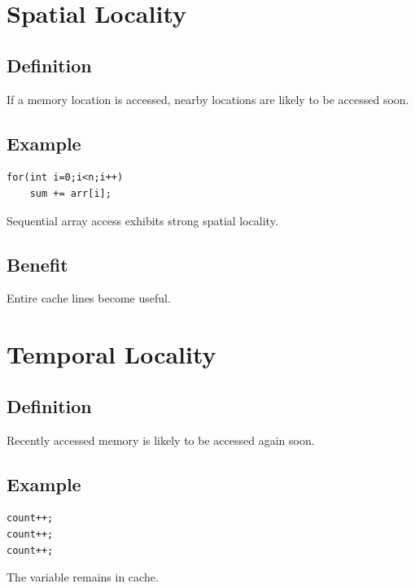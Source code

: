 \section{Spatial Locality}

\subsection{Definition}

If a memory location is accessed, nearby locations are likely to be accessed soon.

\subsection{Example}

\begin{verbatim}
for(int i=0;i<n;i++)
    sum += arr[i];
\end{verbatim}

Sequential array access exhibits strong spatial locality.

\subsection{Benefit}

Entire cache lines become useful.

\section{Temporal Locality}

\subsection{Definition}

Recently accessed memory is likely to be accessed again soon.

\subsection{Example}

\begin{verbatim}
count++;
count++;
count++;
\end{verbatim}

The variable remains in cache.

